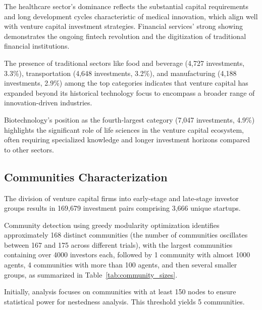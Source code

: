 The healthcare sector's dominance reflects the substantial capital requirements and long development cycles characteristic of medical innovation, which align well with venture capital investment strategies. Financial services' strong showing demonstrates the ongoing fintech revolution and the digitization of traditional financial institutions.

The presence of traditional sectors like food and beverage (4,727 investments, 3.3\%), transportation (4,648 investments, 3.2\%), and manufacturing (4,188 investments, 2.9\%) among the top categories indicates that venture capital has expanded beyond its historical technology focus to encompass a broader range of innovation-driven industries.

Biotechnology's position as the fourth-largest category (7,047 investments, 4.9\%) highlights the significant role of life sciences in the venture capital ecosystem, often requiring specialized knowledge and longer investment horizons compared to other sectors.

\subsection{Communities Characterization}

\newcommand{\invPairs}{169,679}
\newcommand{\invPairsUniqueStartups}{3,666}

The division of venture capital firms into early-stage and late-stage investor groups results in \invPairs{} investment pairs comprising \invPairsUniqueStartups{} unique startups.

\newcommand{\numCommunities}{168}
\newcommand{\numTopCommunities}{5}
\newcommand{\numCommunitiesThreshold}{150}

Community detection using greedy modularity optimization identifies approximately \numCommunities{} distinct communities (the number of communities oscillates between 167 and 175 across different trials), with the largest communities containing over 4000 investors each, followed by 1 community with almost 1000 agents, 4 communities with more than 100 agents, and then several smaller groups, as summarized in Table~\ref{tab:community_sizes}.

Initially, analysis focuses on communities with at least \numCommunitiesThreshold{} nodes to ensure statistical power for nestedness analysis. This threshold yields \numTopCommunities{} communities.

